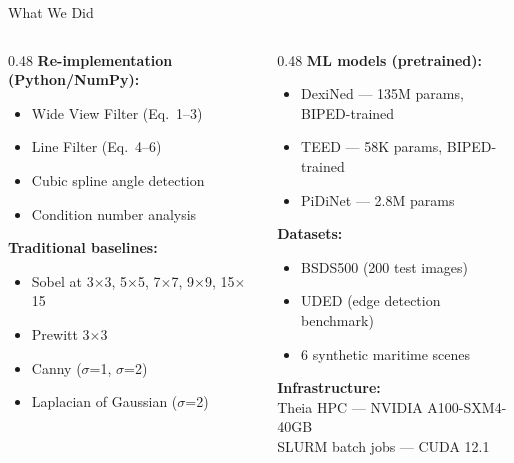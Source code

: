 \documentclass[10pt, aspectratio=169]{beamer}
\begin{document}
\begin{frame}{What We Did}
  \begin{columns}[T]
    \begin{column}{0.48\textwidth}
      \textbf{Re-implementation (Python/NumPy):}
      \begin{itemize}
        \item Wide View Filter (Eq.~1--3)
        \item Line Filter (Eq.~4--6)
        \item Cubic spline angle detection
        \item Condition number analysis
      \end{itemize}
      \vspace{0.5em}
      \textbf{Traditional baselines:}
      \begin{itemize}
        \item Sobel at 3$\times$3, 5$\times$5, 7$\times$7, 9$\times$9, 15$\times$15
        \item Prewitt 3$\times$3
        \item Canny ($\sigma$=1, $\sigma$=2)
        \item Laplacian of Gaussian ($\sigma$=2)
      \end{itemize}
    \end{column}
    \begin{column}{0.48\textwidth}
      \textbf{ML models (pretrained):}
      \begin{itemize}
        \item DexiNed --- 135M params, BIPED-trained
        \item TEED --- 58K params, BIPED-trained
        \item PiDiNet --- 2.8M params
      \end{itemize}
      \vspace{0.5em}
      \textbf{Datasets:}
      \begin{itemize}
        \item BSDS500 (200 test images)
        \item UDED (edge detection benchmark)
        \item 6 synthetic maritime scenes
      \end{itemize}
      \vspace{0.5em}
      \textbf{Infrastructure:}\\
      Theia HPC --- NVIDIA A100-SXM4-40GB\\
      SLURM batch jobs --- CUDA 12.1
    \end{column}
  \end{columns}
\end{frame}
\end{document}
